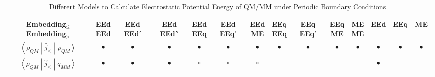 \documentclass{article}
\begin{document}

\begin{table}[tbp]
\begin{threeparttable}
\caption{Different Models to Calculate Electrostatic Potential Energy of QM/MM under Periodic Boundary Conditions}
\begin{tabular}{cccccccccccccc}
\hline
\makecell{Embedding$_\leq$\\Embedding$_>$}                                & \makecell{EEd\\EEd} & \makecell{EEd\\EEd$'$} & \makecell{EEd\\EEd$''$}             & \makecell{EEd\\EEq}                                                                                                      & \makecell{EEd\\EEq$'$} & \makecell{EEd\\ME}                  & \makecell{EEq\\EEq}                               & \makecell{EEq\\EEq$'$} & \makecell{EEq\\ME} & \makecell{ME\\ME} & \makecell{EEd\\~}    & \makecell{EEq\\~} & \makecell{ME\\~} \\ \hline
$\left< \rho_{QM} \middle| \hat{j}_{\leq} \middle| \rho_{QM} \right>$     & $\bullet$           & $\bullet$              & $\bullet$                           & $\bullet$                                                                                                                & $\bullet$              & $\bullet$                           & $\bullet$                                         & $\bullet$              & $\bullet$          & $\bullet$         & $\bullet$            & $\bullet$         & $\bullet$        \\
\rowcolor{Gray}
$\left< \rho_{QM} \middle| \hat{j}_{\leq} \middle| q_{MM} \right>$        & $\bullet$           & $\bullet$              & $\bullet$                           & $\circ$                                                                                                                  & $\circ$                & $\circ$                             &                                                   &                        &                    &                   & $\bullet$            &                   &                  \\

\end{tabular}
\end{threeparttable}
\end{table}
\end{document}
